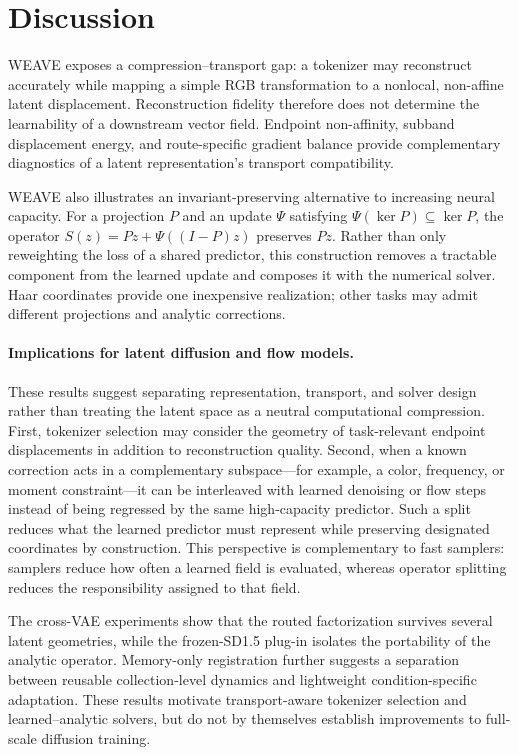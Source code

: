 \documentclass[letterpaper]{article} %
\begin{document}
\FloatBarrier
\section{Discussion}
\label{sec:discussion}

WEAVE exposes a compression--transport gap: a tokenizer may reconstruct
accurately while mapping a simple RGB transformation to a nonlocal,
non-affine latent displacement. Reconstruction fidelity therefore does
not determine the learnability of a downstream vector field. Endpoint
non-affinity, subband displacement energy, and route-specific gradient
balance provide complementary diagnostics of a latent representation's
transport compatibility.

WEAVE also illustrates an invariant-preserving alternative to increasing
neural capacity. For a projection $P$ and an update $\Psi$ satisfying
$\Psi(\ker P)\subseteq\ker P$, the operator
$S(z)=Pz+\Psi((I-P)z)$ preserves $Pz$. Rather than only reweighting the
loss of a shared predictor, this construction removes a tractable
component from the learned update and composes it with the numerical
solver. Haar coordinates provide one inexpensive realization; other
tasks may admit different projections and analytic corrections.

\paragraph{Implications for latent diffusion and flow models.}
These results suggest separating representation, transport, and solver
design rather than treating the latent space as a neutral computational
compression. First, tokenizer selection may consider the geometry of
task-relevant endpoint displacements in addition to reconstruction
quality. Second, when a known correction acts in a complementary
subspace---for example, a color, frequency, or moment constraint---it
can be interleaved with learned denoising or flow steps instead of being
regressed by the same high-capacity predictor. Such a split reduces what the learned predictor must represent while
preserving designated coordinates by construction. This perspective is
complementary to fast samplers: samplers reduce how often a learned
field is evaluated, whereas operator splitting reduces the
responsibility assigned to that field.

The cross-VAE experiments show that the routed factorization survives
several latent geometries, while the frozen-SD1.5 plug-in isolates the
portability of the analytic operator. Memory-only registration further
suggests a separation between reusable collection-level dynamics and
lightweight condition-specific adaptation. These results motivate
transport-aware tokenizer selection and learned--analytic solvers, but
do not by themselves establish improvements to full-scale diffusion
training.
\end{document}
